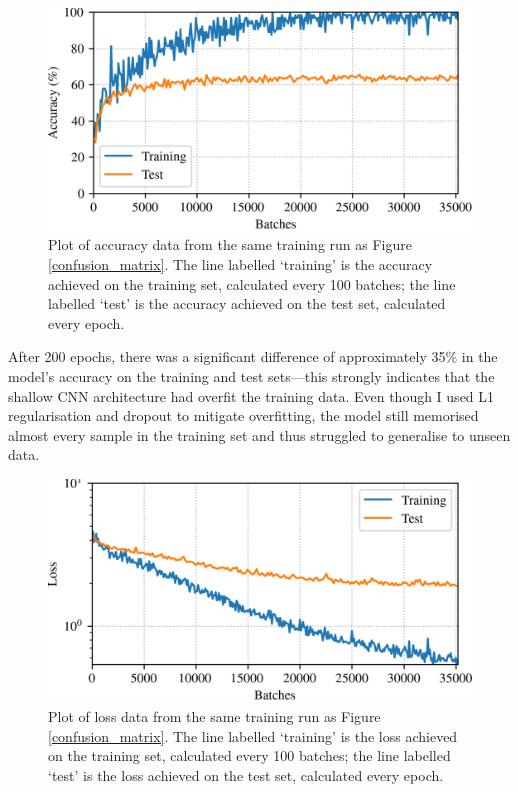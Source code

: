 \documentclass[conference]{IEEEtran}
\begin{document}
\begin{figure}[htbp]
    \centerline{\includegraphics[width=\columnwidth]{accuracy.png}}
    \caption{
        Plot of accuracy data from the same training run as Figure \ref{confusion_matrix}.
        The line labelled `training' is the accuracy achieved on the training set, calculated every 100 batches; the line labelled `test' is the accuracy achieved on the test set, calculated every epoch.}
    \label{accuracy_curves}
\end{figure}

After 200 epochs, there was a significant difference of approximately 35\% in the model's accuracy on the training and test sets---this strongly indicates that the shallow CNN architecture had overfit the training data.
Even though I used L1 regularisation and dropout to mitigate overfitting, the model still memorised almost every sample in the training set and thus struggled to generalise to unseen data.

\begin{figure}[htbp]
    \centerline{\includegraphics[width=\columnwidth]{loss.png}}
    \caption{
        Plot of loss data from the same training run as Figure \ref{confusion_matrix}.
        The line labelled `training' is the loss achieved on the training set, calculated every 100 batches; the line labelled `test' is the loss achieved on the test set, calculated every epoch.
    }
    \label{loss_curves}
\end{figure}
\end{document}
